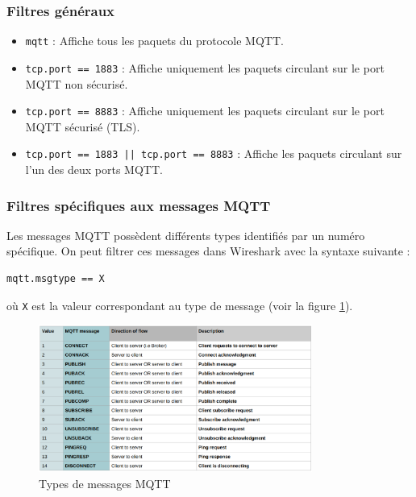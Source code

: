 \documentclass{article}
\begin{document}
\subsubsection{Filtres généraux}
\begin{itemize}
    \item \texttt{mqtt} : Affiche tous les paquets du protocole MQTT.
    \item \texttt{tcp.port == 1883} : Affiche uniquement les paquets circulant sur le port MQTT non sécurisé.
    \item \texttt{tcp.port == 8883} : Affiche uniquement les paquets circulant sur le port MQTT sécurisé (TLS).
    \item \texttt{tcp.port == 1883 || tcp.port == 8883} : Affiche les paquets circulant sur l'un des deux ports MQTT.
\end{itemize}

\subsubsection{Filtres spécifiques aux messages MQTT}
Les messages MQTT possèdent différents types identifiés par un numéro spécifique. On peut filtrer ces messages dans Wireshark avec la syntaxe suivante :

\begin{verbatim}
mqtt.msgtype == X
\end{verbatim}

où \texttt{X} est la valeur correspondant au type de message (voir la figure \ref{fig:msgtype}).

\begin{figure}[H]
    \centering
    \includegraphics[width=0.8\textwidth]{Images/msgtype.png}
    \caption{Types de messages MQTT}
    \label{fig:msgtype}
\end{figure}
\end{document}
